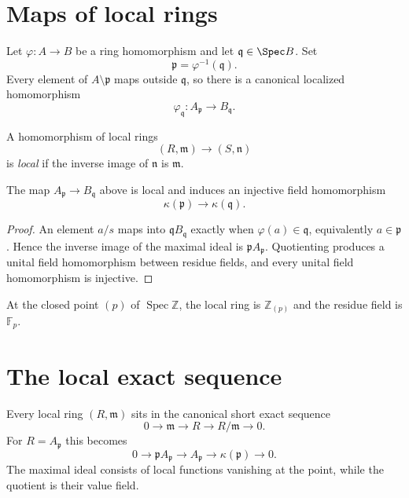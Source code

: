 \section{Maps of local rings}

Let $\varphi:A\to B$ be a ring homomorphism and let $\mathfrak q\in\Spec B$.  Set
\[
\mathfrak p=\varphi^{-1}(\mathfrak q).
\]
Every element of $A\setminus\mathfrak p$ maps outside $\mathfrak q$, so there is a canonical
localized homomorphism
\[
\varphi_{\mathfrak q}:A_{\mathfrak p}\longrightarrow B_{\mathfrak q}.
\]

\begin{definition}
A homomorphism of local rings
\[
(R,\mathfrak m)\longrightarrow(S,\mathfrak n)
\]
is \emph{local} if the inverse image of $\mathfrak n$ is $\mathfrak m$.
\end{definition}

\begin{proposition}
The map $A_{\mathfrak p}\to B_{\mathfrak q}$ above is local and induces an injective field
homomorphism
\[
\kappa(\mathfrak p)\longrightarrow\kappa(\mathfrak q).
\]
\end{proposition}

\begin{proof}
An element $a/s$ maps into $\mathfrak qB_{\mathfrak q}$ exactly when
$\varphi(a)\in\mathfrak q$, equivalently $a\in\mathfrak p$.  Hence the inverse image of
the maximal ideal is $\mathfrak pA_{\mathfrak p}$.  Quotienting produces a unital field
homomorphism between residue fields, and every unital field homomorphism is injective.
\end{proof}



\begin{example}\label{ex:vi11-expand-03}
At the closed point $(p)$ of $\operatorname{Spec}\mathbb Z$, the local ring is $\mathbb Z_{(p)}$ and the residue field is $\mathbb F_p$.
\end{example}
\section{The local exact sequence}

Every local ring $(R,\mathfrak m)$ sits in the canonical short exact sequence
\[
0\longrightarrow\mathfrak m
\longrightarrow R
\longrightarrow R/\mathfrak m
\longrightarrow0.
\]
For $R=A_{\mathfrak p}$ this becomes
\[
0\longrightarrow\mathfrak pA_{\mathfrak p}
\longrightarrow A_{\mathfrak p}
\longrightarrow\kappa(\mathfrak p)
\longrightarrow0.
\]
The maximal ideal consists of local functions vanishing at the point, while the quotient is
their value field.

